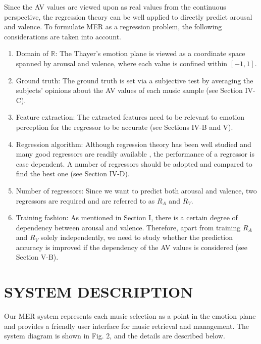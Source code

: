 \documentclass[journal, twoside]{IEEEtran}
\begin{document}
Since the AV values are viewed upon as real values from the
continuous perspective, the regression theory can be well applied to directly predict arousal and valence. To formulate MER as a regression problem, the following considerations are taken into account.
\begin{enumerate}
    \item Domain of \(\mathbb{R}\): The Thayer’s emotion plane is viewed as a coordinate space spanned by arousal and valence, where each value is confined within \([-1,1]\).
    
    \item Ground truth: The ground truth is set via a subjective test by averaging the subjects’ opinions about the AV values of each music sample (see Section IV-C).
    
    \item Feature extraction: The extracted features need to be relevant to emotion perception for the regressor to be accurate (see Sections IV-B and V).
    
    \item Regression algorithm: Although regression theory has been well studied and many good regressors are readily available \cite{17}, the performance of a regressor is case dependent. A number of regressors should be adopted and compared to find the best one (see Section IV-D).
    
    \item Number of regressors: Since we want to predict both arousal and valence, two regressors are required and are referred to as \(R_A\) and \(R_V\).
    
    \item Training fashion: As mentioned in Section I, there is a certain degree of dependency between arousal and valence. Therefore, apart from training \(R_A\) and \(R_V\) solely independently, we need to study whether the prediction accuracy is improved if the dependency of the AV values is considered (see Section V-B).
    
\end{enumerate}

\section{SYSTEM DESCRIPTION}
Our MER system represents each music selection as a point
in the emotion plane and provides a friendly user interface for music retrieval and management. The system diagram is shown in Fig. 2, and the details are described below.
\end{document}
